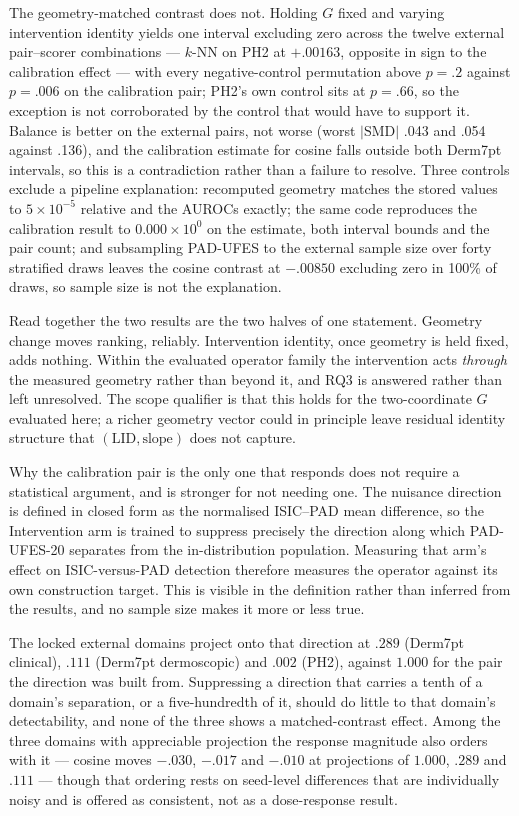 \documentclass[11pt,a4paper]{article}
\begin{document}
The geometry-matched contrast does not. Holding $G$ fixed and varying intervention identity yields one interval excluding zero across the twelve external pair--scorer combinations --- $k$-NN on PH2 at $+.00163$, opposite in sign to the calibration effect --- with every negative-control permutation above $p=.2$ against $p=.006$ on the calibration pair; PH2's own control sits at $p=.66$, so the exception is not corroborated by the control that would have to support it. Balance is better on the external pairs, not worse (worst $|\mathrm{SMD}|$ .043 and .054 against .136), and the calibration estimate for cosine falls outside both Derm7pt intervals, so this is a contradiction rather than a failure to resolve. Three controls exclude a pipeline explanation: recomputed geometry matches the stored values to $5\times10^{-5}$ relative and the AUROCs exactly; the same code reproduces the calibration result to $0.000\times10^{0}$ on the estimate, both interval bounds and the pair count; and subsampling PAD-UFES to the external sample size over forty stratified draws leaves the cosine contrast at $-.00850$ excluding zero in 100\% of draws, so sample size is not the explanation.

Read together the two results are the two halves of one statement. Geometry change moves ranking, reliably. Intervention identity, once geometry is held fixed, adds nothing. Within the evaluated operator family the intervention acts \emph{through} the measured geometry rather than beyond it, and RQ3 is answered rather than left unresolved. The scope qualifier is that this holds for the two-coordinate $G$ evaluated here; a richer geometry vector could in principle leave residual identity structure that $(\mathrm{LID},\text{slope})$ does not capture.

Why the calibration pair is the only one that responds does not require a
statistical argument, and is stronger for not needing one. The nuisance
direction is defined in closed form as the normalised ISIC--PAD mean
difference, so the Intervention arm is trained to suppress precisely the
direction along which PAD-UFES-20 separates from the in-distribution
population. Measuring that arm's effect on ISIC-versus-PAD detection therefore
measures the operator against its own construction target. This is visible in
the definition rather than inferred from the results, and no sample size makes
it more or less true.

The locked external domains project onto that direction at $.289$ (Derm7pt
clinical), $.111$ (Derm7pt dermoscopic) and $.002$ (PH2), against $1.000$ for
the pair the direction was built from. Suppressing a direction that carries a
tenth of a domain's separation, or a five-hundredth of it, should do little to
that domain's detectability, and none of the three shows a matched-contrast
effect. Among the three domains with appreciable projection the response
magnitude also orders with it --- cosine moves $-.030$, $-.017$ and $-.010$ at
projections of $1.000$, $.289$ and $.111$ --- though that ordering rests on
seed-level differences that are individually noisy and is offered as
consistent, not as a dose-response result.
\end{document}
